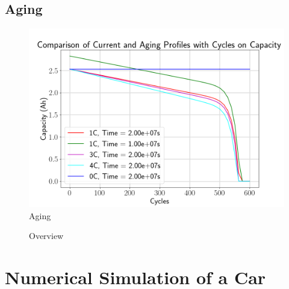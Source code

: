 \documentclass[12pt, a4paper]{article}
\begin{document}

  \subsection{Aging}
  \begin{figure}[H]
    \centering
    \includegraphics[width=0.7\linewidth]{figures/aging.png}
    \caption{Aging}
    \label{fig:aging}
  \end{figure}

  \begin{figure}[H]
    \centering
    \caption{Overview}
    \label{fig:model-overview}
  \end{figure}

  \section{Numerical Simulation of a Car}
\end{document}
